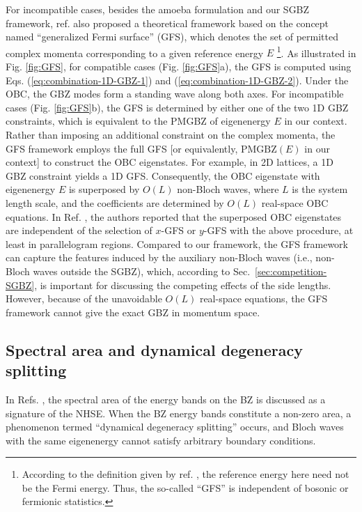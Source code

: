 \documentclass[pdflatex,sn-nature, iicol]{sn-jnl}%
\theoremstyle{thmstyleone}%
\theoremstyle{thmstyletwo}%
\theoremstyle{thmstylethree}%
\begin{document}
For incompatible cases, besides the amoeba formulation and our SGBZ
framework, ref. \cite{zhangAlgebraicNonHermitianSkin2025} also proposed
a theoretical framework based on the concept named ``generalized
Fermi surface'' (GFS), which denotes the set of permitted complex
momenta corresponding to a given reference energy $E$ \footnote{According to the definition given by ref. \cite{zhangAlgebraicNonHermitianSkin2025},
the reference energy here need not be the Fermi energy. Thus, the
so-called ``GFS'' is independent of bosonic or fermionic statistics. }. As illustrated in Fig. \ref{fig:GFS}, for compatible cases (Fig.
\ref{fig:GFS}a), the GFS is computed using Eqs. (\ref{eq:combination-1D-GBZ-1})
and (\ref{eq:combination-1D-GBZ-2}). Under the OBC, the GBZ modes
form a standing wave along both axes. For incompatible cases (Fig.
\ref{fig:GFS}b), the GFS is determined by either one of the two 1D
GBZ constraints, which is equivalent to the PMGBZ of eigenenergy $E$
in our context. Rather than imposing an additional constraint on the
complex momenta, the GFS framework employs the full GFS {[}or equivalently,
$\text{PMGBZ}(E)$ in our context{]} to construct the OBC eigenstates.
For example, in 2D lattices, a 1D GBZ constraint yields a 1D GFS.
Consequently, the OBC eigenstate with eigenenergy $E$ is superposed
by $O(L)$ non-Bloch waves, where $L$ is the system length scale,
and the coefficients are determined by $O(L)$ real-space OBC equations.
In Ref. \cite{zhangAlgebraicNonHermitianSkin2025}, the authors reported
that the superposed OBC eigenstates are independent of the selection
of $x$-GFS or $y$-GFS with the above procedure, at least in parallelogram
regions. Compared to our framework, the GFS framework can capture
the features induced by the auxiliary non-Bloch waves (i.e., non-Bloch
waves outside the SGBZ), which, according to Sec.~\ref{sec:competition-SGBZ}, is important
for discussing the competing effects of the side lengths. However,
because of the unavoidable $O(L)$ real-space equations, the GFS framework
cannot give the exact GBZ in momentum space.


\subsection{Spectral area and dynamical degeneracy splitting}

In Refs. \cite{zhangUniversalNonHermitianSkin2022,zhangDynamicalDegeneracySplitting2023},
the spectral area of the energy bands on the BZ is discussed as a
signature of the NHSE. When the BZ energy bands constitute a non-zero
area, a phenomenon termed ``dynamical degeneracy splitting'' occurs,
and Bloch waves with the same eigenenergy cannot satisfy arbitrary
boundary conditions. 
\end{document}
